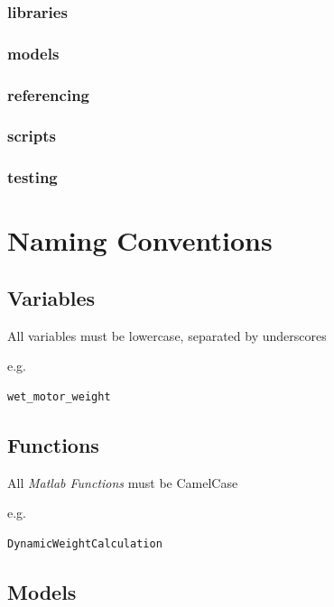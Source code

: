 \documentclass[]{book}
\begin{document}
\subsubsection{libraries}\label{libraries}

\subsubsection{models}\label{models}

\subsubsection{referencing}\label{referencing}

\subsubsection{scripts}\label{scripts}

\subsubsection{testing}\label{testing}

\section{Naming Conventions}\label{naming-conventions}

\subsection{Variables}\label{variables}

All variables must be lowercase, separated by underscores

e.g.

\begin{verbatim}
wet_motor_weight
\end{verbatim}

\subsection{Functions}\label{functions-1}

All \emph{Matlab Functions} must be CamelCase

e.g.

\begin{verbatim}
DynamicWeightCalculation
\end{verbatim}

\subsection{Models}\label{models-1}
\end{document}
